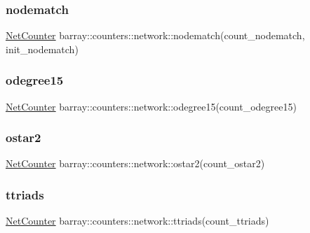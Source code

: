 \subsubsection{\texorpdfstring{nodematch}{nodematch}}
{\footnotesize\ttfamily \hyperlink{namespacebarray_1_1counters_1_1network_a0246d66b7032c9d44a10d4fd025e1ac5}{Net\+Counter} barray\+::counters\+::network\+::nodematch(count\+\_\+nodematch, init\+\_\+nodematch)}

\mbox{\label{namespacebarray_1_1counters_1_1network_abe7460ebbe046a0b23e17915b004e4f9}} 
\subsubsection{\texorpdfstring{odegree15}{odegree15}}
{\footnotesize\ttfamily \hyperlink{namespacebarray_1_1counters_1_1network_a0246d66b7032c9d44a10d4fd025e1ac5}{Net\+Counter} barray\+::counters\+::network\+::odegree15(count\+\_\+odegree15)}

\mbox{\label{namespacebarray_1_1counters_1_1network_a43e5d9295026bcb8509e87708ad5672f}} 
\subsubsection{\texorpdfstring{ostar2}{ostar2}}
{\footnotesize\ttfamily \hyperlink{namespacebarray_1_1counters_1_1network_a0246d66b7032c9d44a10d4fd025e1ac5}{Net\+Counter} barray\+::counters\+::network\+::ostar2(count\+\_\+ostar2)}

\mbox{\label{namespacebarray_1_1counters_1_1network_acfa471203e5630abbba918dbd05cc24b}} 
\subsubsection{\texorpdfstring{ttriads}{ttriads}}
{\footnotesize\ttfamily \hyperlink{namespacebarray_1_1counters_1_1network_a0246d66b7032c9d44a10d4fd025e1ac5}{Net\+Counter} barray\+::counters\+::network\+::ttriads(count\+\_\+ttriads)}

